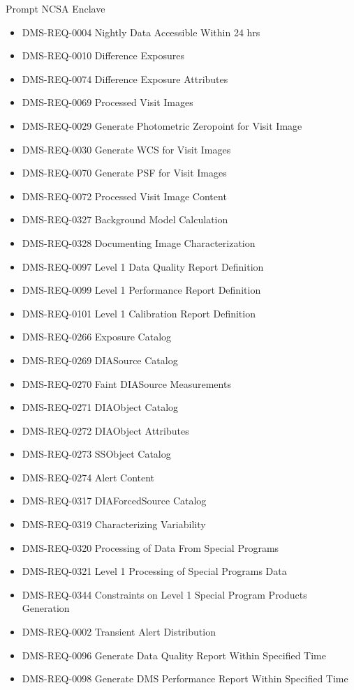 Prompt NCSA Enclave \begin{itemize}
\item DMS-REQ-0004 Nightly Data Accessible Within 24 hrs
\item DMS-REQ-0010 Difference Exposures
\item DMS-REQ-0074 Difference Exposure Attributes
\item DMS-REQ-0069 Processed Visit Images
\item DMS-REQ-0029 Generate Photometric Zeropoint for Visit Image
\item DMS-REQ-0030 Generate WCS for Visit Images
\item DMS-REQ-0070 Generate PSF for Visit Images
\item DMS-REQ-0072 Processed Visit Image Content
\item DMS-REQ-0327 Background Model Calculation
\item DMS-REQ-0328 Documenting Image Characterization
\item DMS-REQ-0097 Level 1 Data Quality Report Definition
\item DMS-REQ-0099 Level 1 Performance Report Definition
\item DMS-REQ-0101 Level 1 Calibration Report Definition
\item DMS-REQ-0266 Exposure Catalog
\item DMS-REQ-0269 DIASource Catalog
\item DMS-REQ-0270 Faint DIASource Measurements
\item DMS-REQ-0271 DIAObject Catalog
\item DMS-REQ-0272 DIAObject Attributes
\item DMS-REQ-0273 SSObject Catalog
\item DMS-REQ-0274 Alert Content
\item DMS-REQ-0317 DIAForcedSource Catalog
\item DMS-REQ-0319 Characterizing Variability
\item DMS-REQ-0320 Processing of Data From Special Programs
\item DMS-REQ-0321 Level 1 Processing of Special Programs Data
\item DMS-REQ-0344 Constraints on Level 1 Special Program Products Generation
\item DMS-REQ-0002 Transient Alert Distribution
\item DMS-REQ-0096 Generate Data Quality Report Within Specified Time
\item DMS-REQ-0098 Generate DMS Performance Report Within Specified Time

\end{itemize}
